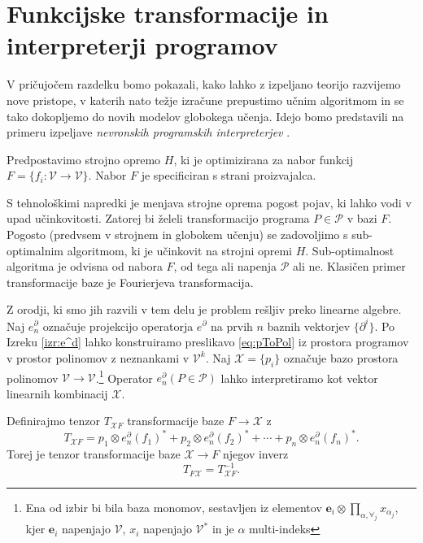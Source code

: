 \documentclass[a4paper, 12pt]{book}
\newcommand{\VV}{\mathcal{V}}
\newcommand{\e}{\mathbf{e}}
\newcommand{\X}{\mathcal{X}}
\newcommand{\dP}{\mathcal{P}}
\newcommand{\D}{\partial}
\begin{document}
\section{Funkcijske transformacije in interpreterji programov}\label{sec:FunTrans}

V pričujočem razdelku bomo pokazali, kako lahko z izpeljano teorijo razvijemo nove pristope, v katerih nato težje izračune prepustimo učnim algoritmom in se tako dokopljemo do novih modelov globokega učenja. Idejo bomo predstavili na primeru izpeljave \emph{nevronskih programskih interpreterjev} \cite{progInterp}.

Predpostavimo strojno opremo $H$, ki je optimizirana za nabor funkcij
   $F=\{f_i:\VV\to \VV\}$. Nabor $F$ je specificiran s strani proizvajalca.  
   
   S tehnološkimi napredki je menjava strojne oprema pogost pojav, ki lahko vodi v upad učinkovitosti. Zatorej bi želeli transformacijo programa $P\in\dP$ v bazi $F$. Pogosto (predvsem v strojnem in globokem učenju) se zadovoljimo s sub-optimalnim algoritmom, ki je učinkovit na strojni opremi $H$. Sub-optimalnost algoritma je odvisna od nabora $F$, od tega ali napenja $\dP$ ali ne. Klasičen primer transformacije baze je Fourierjeva transformacija.

Z orodji, ki smo jih razvili v tem delu je problem rešljiv preko linearne algebre. Naj $e^\D_n$ označuje projekcijo operatorja $e^\D$ na prvih $n$ baznih vektorjev $\{\D^i\}$. Po Izreku \ref{izr:e^d} lahko konstruiramo preslikavo \eqref{eq:pToPol} iz prostora programov v prostor polinomov z neznankami v $\VV^k$. Naj $\X=\{p_i\}$ označuje bazo prostora polinomov $\VV\to \VV$.\footnote{Ena od izbir bi bila baza monomov,
sestavljen iz elementov  $\e_i\otimes\prod\limits_{\alpha,\forall_j}
   x_{\alpha_j}$, kjer $\e_i$ napenjajo $\VV$, $x_i$ napenjajo $\VV^*$ in je $\alpha$
   multi-indeks} Operator $e^\D_n(P\in\dP)$ lahko interpretiramo kot vektor linearnih kombinacij $\X$.
   
Definirajmo tenzor $T_{\X F}$ transformacije baze $F\to\X$ z
  \begin{equation}\label{eq:matTransF}
  T_{\X F}=
  p_1\otimes e_n^\D(f_1)^* + p_2\otimes e_n^\D(f_2)^* + \cdots + p_n\otimes e_n^\D(f_n)^*.
  \end{equation}
Torej je tenzor transformacije baze $\X\to F$ njegov inverz
  \begin{equation}\label{eq:matTrans}
  T_{F\X}=T_{\X F}^{-1}.
  \end{equation}
  
\end{document}
